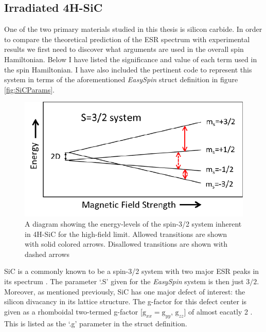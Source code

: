 \documentclass[oneside, astronomy, noacknowlegments]{BYUPhys}
\begin{document}
\subsection{Irradiated 4H-SiC}

One of the two primary materials studied in this thesis is silicon carbide. In order to compare the theoretical prediction of the ESR spectrum with experimental results we first need to discover what arguments are used in the overall spin Hamiltonian. Below I have listed the significance and value of each term used in the spin Hamiltonian. I have also included the pertinent code to represent this system in terms of the aforementioned \textit{EasySpin} struct definition in figure \ref{fig:SiCParams}.

\begin{figure}
    \centerline{\includegraphics{energy_levels_fig}}
    \caption[Energy Levels of 4H-SiC]{\label{fig:MFRelationship}
     A diagram showing the energy-levels of the spin-3/2 system inherent in 4H-SiC for the high-field limit. Allowed transitions are shown with solid colored arrows. Disallowed transitions are shown with dashed arrows}
 \end{figure}

SiC is a commonly known to be a spin-3/2 system with two major ESR peaks in its spectrum \cite{RefWorks:doc:5892964ee4b0499fa95c5108}. The parameter `.S' given for the \textit{EasySpin} system is then just $3/2$. Moreover, as mentioned previously, SiC has one major defect of interest: the silicon divacancy \cite{RefWorks:doc:58929800e4b0499fa95c51a1} \cite{RefWorks:doc:589297a9e4b0d4c09201f736} in its lattice structure. The g-factor for this defect center is given as a rhomboidal two-termed g-factor [$\text{g}_{xx}=\text{g}_{yy}$, $\text{g}_{zz}$] of almost eacatly 2 \cite{RefWorks:doc:5892964ee4b0499fa95c5108}. This is listed as the `.g' parameter in the struct definition.
\end{document}
